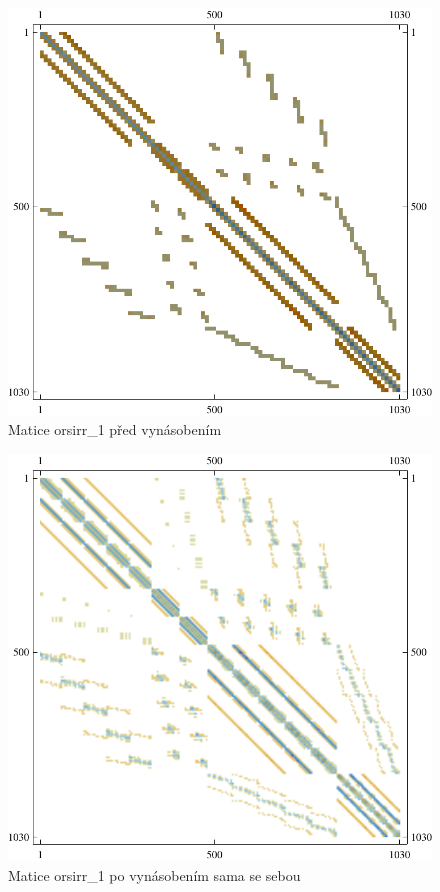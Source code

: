 \begin{figure}[H]
	\includegraphics[width=1.0\textwidth]{./images/orsirr_1_orig}
	\caption{Matice orsirr\_1 před vynásobením}
	\label{fig:befOrsirr1}
\end{figure}

\begin{figure}[H]
	\includegraphics[width=1.0\textwidth]{./images/orsirr_1_mul}
	\caption{Matice orsirr\_1 po vynásobením sama se sebou}
	\label{fig:aftOrsirr1}
\end{figure}

